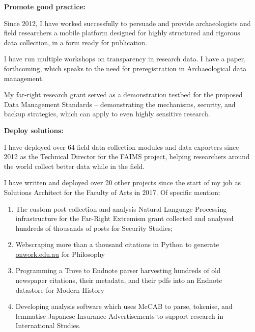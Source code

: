 \documentclass[11pt, a4paper]{awesome-cv}
\begin{document}
\begin{cvletter}

\textbf{Promote good practice:} 
\begin{letteritems}
\item {Since 2012, I have worked successfully to persuade and provide archaeologists and field researchers a mobile platform designed for highly structured and rigorous data collection, in a form ready for publication.}
\item {I have run multiple workshops on transparency in research data. I have a paper, forthcoming, which speaks to the need for preregistration in Archaeological data management.}
\item {My far-right research grant served as a demonstration testbed for the proposed Data Management Standards -- demonstrating the mechanisms, security, and backup strategies, which can apply to even highly sensitive research.} 
\end{letteritems}


\textbf{Deploy solutions:} 
\begin{letteritems}
\item {I have deployed over 64 field data collection modules and data exporters since 2012 as the Technical Director for the FAIMS project, helping researchers around the world collect better data while in the field.}
\item {I have written and deployed over 20 other projects since the start of my job as Solutions Architect for the Faculty of Arts in 2017. Of specific mention:} 
\begin{enumerate} 
	\item {The custom post collection and analysis Natural Language Processing infrastructure for the Far-Right Extremism grant collected and analysed hundreds of thousands of posts for Security Studies;}
	\item {Webscraping more than a thousand citations in Python to generate \href{https://onwork.edu.au}{onwork.edu.au} for Philosophy}
	\item {Programming a Trove to Endnote parser harvesting hundreds of old newspaper citations, their metadata, and their pdfs into an Endnote datastore for Modern History}
	\item {Developing analysis software which uses MeCAB to parse, tokenise, and lemmatise Japanese Insurance Advertisements to support research in International Studies.}
\end{enumerate}
\end{letteritems}


\end{cvletter}
\end{document}
